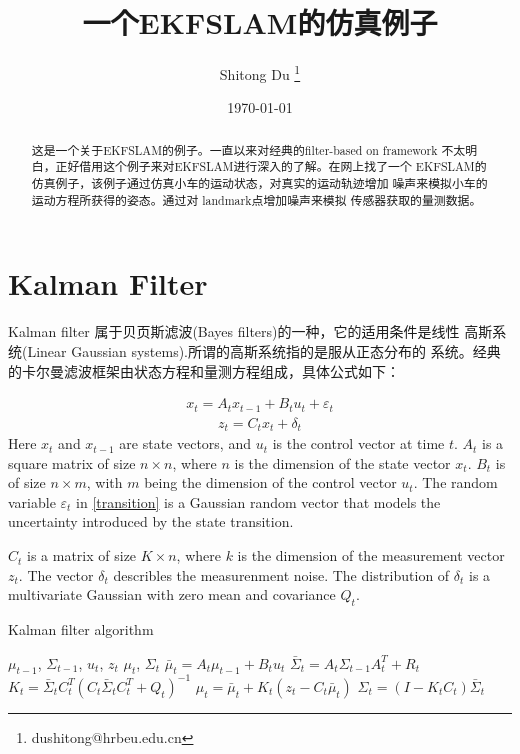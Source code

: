 \documentclass[UTF8,a4paper,10pt]{ctexart}
\title{一个EKFSLAM的仿真例子}
\author{ Shitong Du 
  \thanks{dushitong@hrbeu.edu.cn} 
}
\date{\today}
\begin{document}
    \maketitle
\begin{abstract}
这是一个关于EKFSLAM的例子。一直以来对经典的filter-based on framework 
不太明白，正好借用这个例子来对EKFSLAM进行深入的了解。在网上找了一个
EKFSLAM的仿真例子，该例子通过仿真小车的运动状态，对真实的运动轨迹增加
噪声来模拟小车的运动方程所获得的姿态。通过对 landmark点增加噪声来模拟
传感器获取的量测数据。
\end{abstract}
\section{Kalman Filter} 
\label{sec:one}
Kalman filter 属于贝页斯滤波(Bayes filters)的一种，它的适用条件是线性
高斯系统(Linear Gaussian systems).所谓的高斯系统指的是服从正态分布的
系统。经典的卡尔曼滤波框架由状态方程和量测方程组成，具体公式如下：

\begin{align}
x_t = A_tx_{t-1}+B_tu_t+\varepsilon_t
\label{transition}
\end{align}
\begin{align}
z_t = C_tx_t+\delta_t
\end{align}
Here $x_t$ and $x_{t-1}$ are state vectors, and $u_t$ is the control vector 
at time $t$. $A_t$ is a square matrix of size $n \times n$, where $n$ is the 
dimension of the state vector $x_t$. $B_t$ is of size $n \times m$, with $m$ 
being the dimension of the control vector $u_t$. The random variable $\varepsilon_t$ 
in \eqref{transition} is a Gaussian random vector that models the uncertainty 
introduced by the state transition. 

$C_t$ is a matrix of size $K \times n$, where $k$ is the dimension of the 
measurement vector $z_t$. The vector $\delta_t$ describles the measurenment 
noise. The distribution of $\delta_t$ is a multivariate Gaussian with zero 
mean and covariance $	Q_t$.
\begin{algorithm}
    \caption{ Kalman filter algorithm }
    \label{alg:KF}
   \begin{algorithmic}[1]
       \Require $\mu_{t-1}$, $\Sigma_{t-1}$, $u_t$, $z_t$
       \Ensure $\mu_t$, $\Sigma_t$
       \State $\bar{\mu}_t=A_t\mu_{t-1}+B_tu_{t}$
       \State $\bar{\Sigma}_{t}=A_t\Sigma_{t-1}A_t^T+R_t$
       \State $K_t=\bar{\Sigma}_tC_t^T(C_t\bar{\Sigma}_tC_t^T+Q_t)^{-1}$
       \State $\mu_t=\bar{\mu}_t+K_t(z_t-C_t\bar{\mu}_t)$
       \State $\Sigma_t=(I-K_tC_t)\bar{\Sigma}_t$
       \State {} 
       \EndFunction
   \end{algorithmic}
\end{algorithm}
\end{document}

